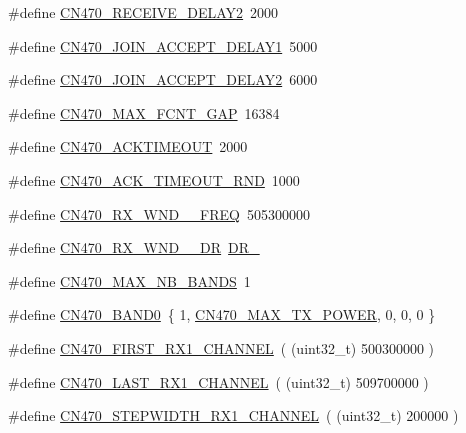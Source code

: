 \begin{DoxyCompactItemize}
\#define \mbox{\hyperlink{group___r_e_g_i_o_n_c_n470_ga60730d21be102b95a2393549c999930d}{C\+N470\+\_\+\+R\+E\+C\+E\+I\+V\+E\+\_\+\+D\+E\+L\+A\+Y2}}~2000
\item 
\#define \mbox{\hyperlink{group___r_e_g_i_o_n_c_n470_ga7fa3d835986d5496a0334572a376dc01}{C\+N470\+\_\+\+J\+O\+I\+N\+\_\+\+A\+C\+C\+E\+P\+T\+\_\+\+D\+E\+L\+A\+Y1}}~5000
\item 
\#define \mbox{\hyperlink{group___r_e_g_i_o_n_c_n470_gad695261614b3d750749b401fcd685e50}{C\+N470\+\_\+\+J\+O\+I\+N\+\_\+\+A\+C\+C\+E\+P\+T\+\_\+\+D\+E\+L\+A\+Y2}}~6000
\item 
\#define \mbox{\hyperlink{group___r_e_g_i_o_n_c_n470_ga5737cff937bc40a5a512f783fd0e9365}{C\+N470\+\_\+\+M\+A\+X\+\_\+\+F\+C\+N\+T\+\_\+\+G\+AP}}~16384
\item 
\#define \mbox{\hyperlink{group___r_e_g_i_o_n_c_n470_gac4bc7c6dea1ebeb1cfe0e9a0ecb0db72}{C\+N470\+\_\+\+A\+C\+K\+T\+I\+M\+E\+O\+UT}}~2000
\item 
\#define \mbox{\hyperlink{group___r_e_g_i_o_n_c_n470_ga020ad82ebe368189c51b4d21a7b5596d}{C\+N470\+\_\+\+A\+C\+K\+\_\+\+T\+I\+M\+E\+O\+U\+T\+\_\+\+R\+ND}}~1000
\item 
\#define \mbox{\hyperlink{group___r_e_g_i_o_n_c_n470_ga2e28269fe49bac86f3143397559e4db4}{C\+N470\+\_\+\+R\+X\+\_\+\+W\+N\+D\+\_\+\_\+\+F\+R\+EQ}}~505300000
\item 
\#define \mbox{\hyperlink{group___r_e_g_i_o_n_c_n470_ga7aefeac71ff5edcd3a5628d12b84a25c}{C\+N470\+\_\+\+R\+X\+\_\+\+W\+N\+D\+\_\+\_\+\+DR}}~\mbox{\hyperlink{group___r_e_g_i_o_n_ga6c4ef966b4f3d5eb7597b087f2b97095}{D\+R\+\_}}
\item 
\#define \mbox{\hyperlink{group___r_e_g_i_o_n_c_n470_ga46b33f1d67ef81deefa12018749a22ff}{C\+N470\+\_\+\+M\+A\+X\+\_\+\+N\+B\+\_\+\+B\+A\+N\+DS}}~1
\item 
\#define \mbox{\hyperlink{group___r_e_g_i_o_n_c_n470_gaf6813f74ce73e4d0ab7971a89ab2ac2e}{C\+N470\+\_\+\+B\+A\+N\+D0}}~\{ 1, \mbox{\hyperlink{group___r_e_g_i_o_n_c_n470_gae977eb62cc9b2f49770b5f0d5ec1e5df}{C\+N470\+\_\+\+M\+A\+X\+\_\+\+T\+X\+\_\+\+P\+O\+W\+ER}}, 0, 0, 0 \}
\item 
\#define \mbox{\hyperlink{group___r_e_g_i_o_n_c_n470_gaffb4e82c12bc61e97f83d18fb4187aa8}{C\+N470\+\_\+\+F\+I\+R\+S\+T\+\_\+\+R\+X1\+\_\+\+C\+H\+A\+N\+N\+EL}}~( (uint32\+\_\+t) 500300000 )
\item 
\#define \mbox{\hyperlink{group___r_e_g_i_o_n_c_n470_ga5a6508f01066a5bde9c059367babd9cb}{C\+N470\+\_\+\+L\+A\+S\+T\+\_\+\+R\+X1\+\_\+\+C\+H\+A\+N\+N\+EL}}~( (uint32\+\_\+t) 509700000 )
\item 
\#define \mbox{\hyperlink{group___r_e_g_i_o_n_c_n470_ga7786b9dddae0675b2d8cc26b0d230756}{C\+N470\+\_\+\+S\+T\+E\+P\+W\+I\+D\+T\+H\+\_\+\+R\+X1\+\_\+\+C\+H\+A\+N\+N\+EL}}~( (uint32\+\_\+t) 200000 )
\end{DoxyCompactItemize}
